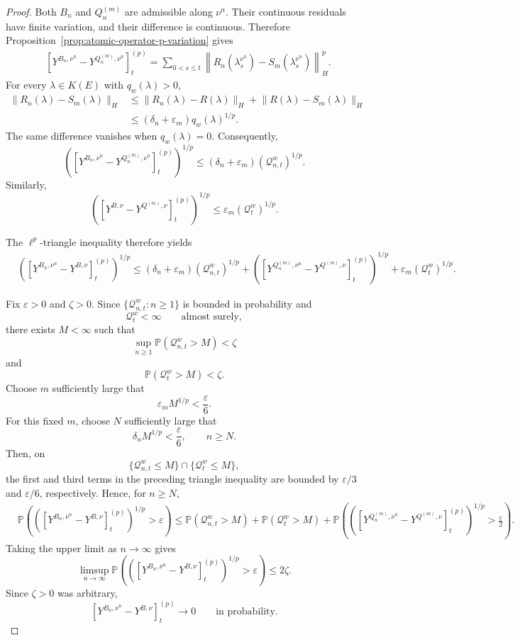 \documentclass[a4paper,10pt]{article}
\renewcommand{\P}{\mathbb P}
\begin{document}
\begin{proof}
Both \(B_n\) and \(Q_n^{(m)}\) are admissible along \(\nu^n\).
Their continuous residuals have finite variation, and their
difference is continuous. Therefore
Proposition~\ref{prop:atomic-operator-p-variation} gives
\[
\begin{aligned}
&
\left[
Y^{B_n,\nu^n}
-
Y^{Q_n^{(m)},\nu^n}
\right]^{(p)}_t
=
\sum_{0<s\le t}
\left\lVert
R_n(\lambda_s^{\nu^n})
-
S_m(\lambda_s^{\nu^n})
\right\rVert_H^p.
\end{aligned}
\]
For every \(\lambda\in K(E)\) with \(q_w(\lambda)>0\),
\[
\begin{aligned}
\lVert R_n(\lambda)-S_m(\lambda)\rVert_H
&\le
\lVert R_n(\lambda)-R(\lambda)\rVert_H
+
\lVert R(\lambda)-S_m(\lambda)\rVert_H
\\
&\le
(\delta_n+\varepsilon_m)q_w(\lambda)^{1/p}.
\end{aligned}
\]
The same difference vanishes when \(q_w(\lambda)=0\). Consequently,
\[
\left(
\left[
Y^{B_n,\nu^n}
-
Y^{Q_n^{(m)},\nu^n}
\right]^{(p)}_t
\right)^{1/p}
\le
(\delta_n+\varepsilon_m)
(\mathcal Q_{n,t}^w)^{1/p}.
\]
Similarly,
\[
\left(
\left[
Y^{B,\nu}
-
Y^{Q^{(m)},\nu}
\right]^{(p)}_t
\right)^{1/p}
\le
\varepsilon_m
(\mathcal Q_t^w)^{1/p}.
\]

The \(\ell^p\)-triangle inequality therefore yields
\[
\begin{aligned}
&
\left(
[Y^{B_n,\nu^n}-Y^{B,\nu}]^{(p)}_t
\right)^{1/p}
\le
(\delta_n+\varepsilon_m)
(\mathcal Q_{n,t}^w)^{1/p}
+
\left(
\left[
Y^{Q_n^{(m)},\nu^n}
-
Y^{Q^{(m)},\nu}
\right]^{(p)}_t
\right)^{1/p}
+
\varepsilon_m
(\mathcal Q_t^w)^{1/p}.
\end{aligned}
\]

Fix \(\varepsilon>0\) and \(\zeta>0\). Since
$
        \{\mathcal Q_{n,t}^w:n\ge1\}
$
is bounded in probability and
\[
        \mathcal Q_t^w<\infty
        \qquad\text{almost surely},
\]
there exists \(M<\infty\) such that
\[
        \sup_{n\ge1}
        \P(\mathcal Q_{n,t}^w>M)
        <
        \zeta
\]
and
\[
        \P(\mathcal Q_t^w>M)
        <
        \zeta.
\]
Choose \(m\) sufficiently large that
\[
        \varepsilon_mM^{1/p}
        <
        \frac{\varepsilon}{6}.
\]
For this fixed \(m\), choose \(N\) sufficiently large that
\[
        \delta_nM^{1/p}
        <
        \frac{\varepsilon}{6},
        \qquad n\ge N.
\]
Then, on
\[
\{\mathcal Q_{n,t}^w\le M\}
\cap
\{\mathcal Q_t^w\le M\},
\]
the first and third terms in the preceding triangle inequality are
bounded by \(\varepsilon/3\) and \(\varepsilon/6\), respectively.
Hence, for \(n\ge N\),
\[
\begin{aligned}
&\P\left(
\left(
[Y^{B_n,\nu^n}-Y^{B,\nu}]^{(p)}_t
\right)^{1/p}
>
\varepsilon
\right)
\le
\P(\mathcal Q_{n,t}^w>M)
+
\P(\mathcal Q_t^w>M)
+
\P\left(
\left(
\left[
Y^{Q_n^{(m)},\nu^n}
-
Y^{Q^{(m)},\nu}
\right]^{(p)}_t
\right)^{1/p}
>
\frac{\varepsilon}{2}
\right).
\end{aligned}
\]
Taking the upper limit as \(n\to\infty\) gives
\[
\limsup_{n\to\infty}
\P\left(
\left(
[Y^{B_n,\nu^n}-Y^{B,\nu}]^{(p)}_t
\right)^{1/p}
>
\varepsilon
\right)
\le
2\zeta.
\]
Since \(\zeta>0\) was arbitrary,
\[
        [Y^{B_n,\nu^n}-Y^{B,\nu}]^{(p)}_t
        \longrightarrow0
        \qquad\text{in probability}.
\]
\end{proof}
\end{document}
